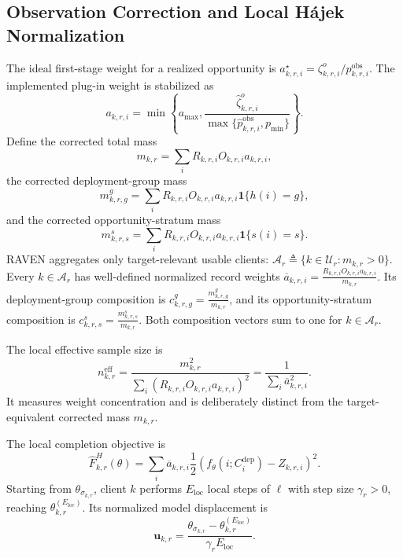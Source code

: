 \documentclass[letterpaper,journal]{IEEEtran}
\begin{document}
\subsection{Observation Correction and Local H\'ajek Normalization}
\label{subsec:observation_hajek}

The ideal first-stage weight for a realized opportunity is
$a^\star_{k,r,i}=\zeta^{o}_{k,r,i}/p^{\mathrm{obs}}_{k,r,i}$.
The implemented plug-in weight is stabilized as
\begin{equation}
 a_{k,r,i}
 =
 \min\!\left\{
 a_{\max},
 \frac{\widehat\zeta^{o}_{k,r,i}}
 {\max\{\widehat p^{\mathrm{obs}}_{k,r,i},p_{\min}\}}
 \right\}.
 \label{eq:a_stabilized}
\end{equation}
Define the corrected total mass
\begin{equation}
    m_{k,r}
    =
    \sum_i
    R_{k,r,i}O_{k,r,i}a_{k,r,i},
    \label{eq:m_total}
\end{equation}
the corrected deployment-group mass
\begin{equation}
 m^{g}_{k,r,g}
 =
 \sum_i
 R_{k,r,i}O_{k,r,i}a_{k,r,i}
 \mathbf{1}\{h(i)=g\},
 \label{eq:m_group}
\end{equation}
and the corrected opportunity-stratum mass
\begin{equation}
 m^{s}_{k,r,s}
 =
 \sum_i
 R_{k,r,i}O_{k,r,i}a_{k,r,i}
 \mathbf{1}\{s(i)=s\}.
 \label{eq:m_stratum}
\end{equation}
RAVEN aggregates only target-relevant usable clients:
$\mathcal{A}_r\triangleq\{k\in\mathcal{U}_r:m_{k,r}>0\}$.
Every $k\in\mathcal{A}_r$ has well-defined normalized record weights
$\overline a_{k,r,i}=\frac{R_{k,r,i}O_{k,r,i}a_{k,r,i}}{m_{k,r}}$.
Its deployment-group composition is
$c^{g}_{k,r,g}=\frac{m^{g}_{k,r,g}}{m_{k,r}}$, and its
opportunity-stratum composition is
$c^{s}_{k,r,s}=\frac{m^{s}_{k,r,s}}{m_{k,r}}$.
Both composition vectors sum to one for $k\in\mathcal{A}_r$.

The local effective sample size is
\begin{equation}
 n^{\mathrm{eff}}_{k,r}
 =
 \frac{m_{k,r}^2}
 {\sum_i
  (R_{k,r,i}O_{k,r,i}a_{k,r,i})^2}
 =
 \frac{1}{\sum_i\overline a_{k,r,i}^2}.
 \label{eq:neff}
\end{equation}
It measures weight concentration and is deliberately distinct from the
target-equivalent corrected mass $m_{k,r}$.

The local completion objective is
\begin{equation}
 \widehat F^{H}_{k,r}(\theta)
 =
 \sum_i
 \overline a_{k,r,i}
 \frac{1}{2}
 \left(
 f_{\theta}(i;C_i^{\mathrm{dep}})
 -
 Z_{k,r,i}
 \right)^2.
 \label{eq:local_hajek_objective}
\end{equation}
Starting from $\theta_{\sigma_{k,r}}$, client $k$ performs
$E_{\mathrm{loc}}$ local steps of $\ell$ with step size $\gamma_r>0$, reaching
$\theta^{(E_{\mathrm{loc}})}_{k,r}$.  Its normalized model
displacement is
\begin{equation}
 \mathbf{u}_{k,r}
 =
 \frac{
 \theta_{\sigma_{k,r}}
 -
 \theta^{(E_{\mathrm{loc}})}_{k,r}
 }{\gamma_r E_{\mathrm{loc}}}.
 \label{eq:normalized_update}
\end{equation}
\end{document}

